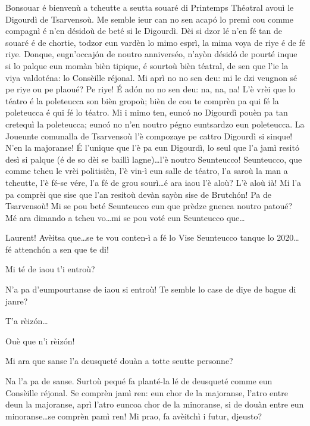 \begin{drama}

\Laurentspeaks Bonsouar é bienvenù a tcheutte a seutta souaré di Printemps Thé$\hat{a}$tral avouì le Digourdì de Tsarvensoù. Me semble ieur can no sen acapó lo premì cou comme compagnì é n'en désidoù de beté si le Digourdì. Dèi si dzor lé n'en fé tan de souaré é de chortie, todzor eun vardèn lo mimo esprì, la mima voya de riye é de fé riye. Donque, eugn'occajón de noutro anniverséo, n’ayòn désidó de pourté inque si lo palque eun momàn bièn tipique, é sourtoù bièn téatral, de sen que l'ie la viya valdoténa: lo Consèille réjonal. Mi aprì no no sen deu: mi le dzi veugnon sé pe riye ou pe plaoué? Pe riye! É ad\'on no no sen deu: na, na, na! L'è vrèi que lo téatro é la poleteucca son bièn gropoù; bièn de cou te comprèn pa qui fé la poleteucca é qui fé lo téatro. Mi i mimo ten, euncó no Digourdì pouèn pa tan cretequì la poleteucca; euncó no n'en noutro pégno euntsardzo eun poleteucca. La Joueunte comunalla de Tsarvensoù l'è compozaye pe cattro Digourdì si sinque! N'en la majoranse! \'E l'unique que l'è pa eun Digourdì, lo seul que l'a jamì resitó desì si palque (é de so dèi se baillì lagne)\ldots l'è noutro Seunteucco! Seunteucco, que comme tcheu le vrèi politisièn, l'è vin-ì eun salle de téatro, l'a saroù la man a tcheutte, l'è fé-se vére, l'a fé de grou sourì\ldots é ara iaou l'è aloù? L'è aloù ià! Mi l'a pa comprèi que sise que l'an resitoù devàn sayòn sise de Brutchón! Pa de Tsarvensoù! Mi se pou beté Seunteucco eun que prèdze gnenca noutro patoué? Mé ara dimando a tcheu vo\ldots mi se pou voté eun Seunteucco que\ldots


\Ronnyspeaks Laurent! Avèitsa que\ldots se te vou conten-ì a fé lo Vise Seunteucco tanque lo 2020\ldots fé attench\'on a sen que te di!

\Laurentspeaks Mi té de iaou t’i entroù?

\Ronnyspeaks N'a pa d'eumpourtanse de iaou si entroù! Te semble lo case  de diye de bague di janre?

\Laurentspeaks T'a rèiz\'on\ldots

\Ronnyspeaks Ouè que n'i rèiz\'on!

\Laurentspeaks Mi ara que sanse l'a deusqueté douàn a totte seutte personne?

\Ronnyspeaks Na l'a pa de sanse. Surtoù pequé fa planté-la lé de deusqueté comme eun Consèille réjonal. Se comprèn jamì ren: eun chor de la majoranse, l'atro entre deun la majoranse, aprì l'atro euncoa chor de la minoranse, si de douàn entre eun minoranse\ldots se comprèn pamì ren! Mi prao, fa avèitchì i futur, djeusto?


\end{drama}
